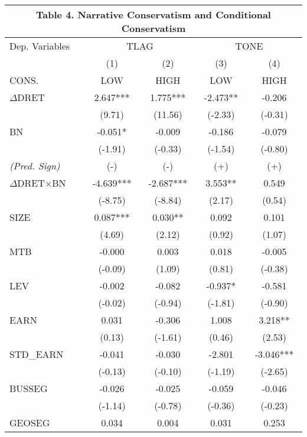 \begin{table}[H] \label{T4}
	\begin{center}
		\tabcolsep=0.11cm
		\begin{tabular}{lcccc}
			\multicolumn{5}{c}{\textbf{Table 4. Narrative Conservatism and Conditional Conservatism}} \\
			\toprule
			\toprule
			Dep. Variables & \multicolumn{2}{c}{TLAG} & \multicolumn{2}{c}{TONE} \\
			\cmidrule{2-5}
			& (1) & (2) & (3) & (4) \\
			CONS. & LOW & HIGH & LOW & HIGH \\
			\midrule
			$\Delta$DRET & 2.647*** & 1.775*** & -2.473** & -0.206 \\
			& (9.71) & (11.56) & (-2.33) & (-0.31) \\
			BN & -0.051* & -0.009 & -0.186 & -0.079 \\
			& (-1.91) & (-0.33) & (-1.54) & (-0.80) \\
			\rowcolor[rgb]{ .906,  .902,  .902} \textit{(Pred. Sign)} & (-) & (-) & (+) & (+) \\
			\rowcolor[rgb]{ .906,  .902,  .902} $\Delta$DRET$\times$BN& -4.639*** & -2.687*** & 3.553** & 0.549 \\
			\rowcolor[rgb]{ .906,  .902,  .902} & (-8.75) & (-8.84) & (2.17) & (0.54) \\
			SIZE & 0.087*** & 0.030** & 0.092 & 0.101 \\
			& (4.69) & (2.12) & (0.92) & (1.07) \\
			MTB & -0.000 & 0.003 & 0.018 & -0.005 \\
			& (-0.09) & (1.09) & (0.81) & (-0.38) \\
			LEV & -0.002 & -0.082 & -0.937* & -0.581 \\
			& (-0.02) & (-0.94) & (-1.81) & (-0.90) \\
			EARN & 0.031 & -0.306 & 1.008 & 3.218** \\
			& (0.13) & (-1.61) & (0.46) & (2.53) \\
			STD\_EARN & -0.041 & -0.030 & -2.801 & -3.046*** \\
			& (-0.13) & (-0.10) & (-1.19) & (-2.65) \\
			BUSSEG & -0.026 & -0.025 & -0.059 & -0.046 \\
			& (-1.14) & (-0.78) & (-0.36) & (-0.23) \\
			GEOSEG & 0.034 & 0.004 & 0.031 & 0.253 \\

\end{tabular}
\end{center}
\end{table}
